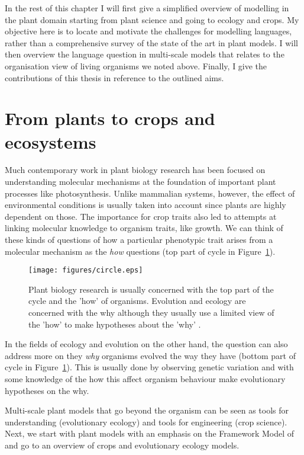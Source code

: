 In the rest of this chapter I will first give a simplified overview of modelling
in the plant domain starting from plant science and going to ecology and
crops. My objective here is to locate and motivate the challenges for modelling
languages, rather than a comprehensive survey of the state of the art in plant
models. I will then overview the language question in multi-scale models that
relates to the organisation view of living organisms we noted above. Finally, I
give the contributions of this thesis in reference to the outlined aims.

\section{From plants to crops and ecosystems}
Much contemporary work in plant biology research has been focused on
understanding molecular mechanisms at the foundation of important plant
processes like photosynthesis. Unlike mammalian systems, however, the effect of
environmental conditions is usually taken into account since plants are highly
dependent on those. The importance for crop traits also led to attempts at
linking molecular knowledge to organism traits, like growth. We can think of
these kinds of questions of how a particular phenotypic trait arises from a
molecular mechanism as the \emph{how} questions (top part of cycle in
Figure~\ref{fig:circle}).

\begin{figure}[tb]
  \centering
  \texttt{[image: figures/circle.eps]}
  \caption{Plant biology research is usually concerned with the top part of the
    cycle and the 'how' of organisms. Evolution and ecology are concerned with
    the why although they usually use a limited view of the 'how' to make
    hypotheses about the 'why' \citep[adapted
    from][]{millar_intracellular_2016}.}
  \label{fig:circle}
\end{figure}

In the fields of ecology and evolution on the other hand, the question can also
address more on they \emph{why} organisms evolved the way they have (bottom part
of cycle in Figure~\ref{fig:circle}). This is usually done by observing genetic
variation and with some knowledge of the how this affect organism behaviour make
evolutionary hypotheses on the why.

Multi-scale plant models that go beyond the organism can be seen as tools for
understanding (evolutionary ecology) and tools for engineering (crop
science). Next, we start with plant models with an emphasis on the Framework
Model of \citet{chew_multiscale_2014} and go to an overview of crops and
evolutionary ecology models.

